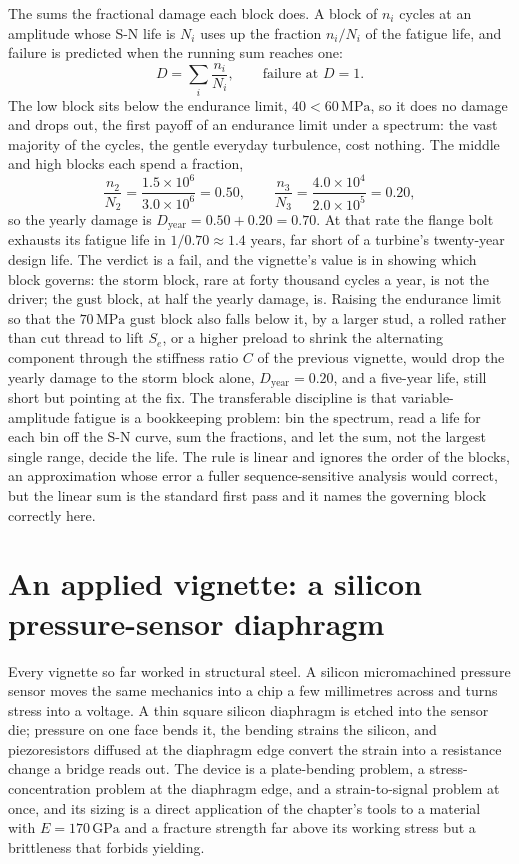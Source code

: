 

The  sums the fractional damage each block
does. A block of $n_i$ cycles at an amplitude whose S-N life is $N_i$ uses
up the fraction $n_i/N_i$ of the fatigue life, and failure is predicted
when the running sum reaches one:
\[
D = \sum_i \frac{n_i}{N_i}, \qquad \text{failure at } D = 1.
\]
The low block sits below the endurance limit, $40 < 60\,\text{MPa}$, so it
does no damage and drops out, the first payoff of an endurance limit under
a spectrum: the vast majority of the cycles, the gentle everyday
turbulence, cost nothing. The middle and high blocks each spend a
fraction,
\[
\frac{n_2}{N_2} = \frac{1.5\times 10^6}{3.0\times 10^6} = 0.50, \qquad
\frac{n_3}{N_3} = \frac{4.0\times 10^4}{2.0\times 10^5} = 0.20,
\]
so the yearly damage is $D_{\text{year}} = 0.50 + 0.20 = 0.70$. At that
rate the flange bolt exhausts its fatigue life in $1/0.70 \approx 1.4$
years, far short of a turbine's twenty-year design life. The verdict is a
fail, and the vignette's value is in showing which block governs: the
storm block, rare at forty thousand cycles a year, is not the driver; the
gust block, at half the yearly damage, is. Raising the endurance limit so
that the $70\,\text{MPa}$ gust block also falls below it, by a larger
stud, a rolled rather than cut thread to lift $S_e$, or a higher preload
to shrink the alternating component through the stiffness ratio $C$ of the
previous vignette, would drop the yearly damage to the storm block alone,
$D_{\text{year}} = 0.20$, and a five-year life, still short but pointing at
the fix. The transferable discipline is that variable-amplitude fatigue is
a bookkeeping problem: bin the spectrum, read a life for each bin off the
S-N curve, sum the fractions, and let the sum, not the largest single
range, decide the life. The rule is linear and ignores the order of the
blocks, an approximation whose error a fuller sequence-sensitive analysis
would correct, but the linear sum is the standard first pass and it names
the governing block correctly here.

\section{An applied vignette: a silicon pressure-sensor
diaphragm}

Every vignette so far worked in structural steel. A silicon
micromachined pressure sensor moves the same mechanics into a chip a few
millimetres across and turns stress into a voltage. A thin square silicon
diaphragm is etched into the sensor die; pressure on one face bends it,
the bending strains the silicon, and piezoresistors diffused at the
diaphragm edge convert the strain into a resistance change a bridge reads
out. The device is a plate-bending problem, a stress-concentration problem
at the diaphragm edge, and a strain-to-signal problem at once, and its
sizing is a direct application of the chapter's tools to a material with
$E = 170\,\text{GPa}$ and a fracture strength far above its working stress
but a brittleness that forbids yielding.


